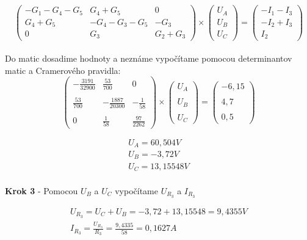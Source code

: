 \begin{equation*}
\begin{pmatrix}
-G_1 - G_4 - G_5 & G_4 + G_5 & 0 \\
G_4 + G_5 & -G_4 - G_3 - G_5 & -G_3 \\
0 & G_3 & G_2 + G_3 
\end{pmatrix}
\times
\begin{pmatrix}
U_A \\
U_B \\
U_C 
\end{pmatrix}
=
\begin{pmatrix}
-I_1 - I_3 \\
-I_2 + I_3 \\
I_2
\end{pmatrix}
\end{equation*}
\\

\noindent Do matic dosadime hodnoty a neznáme vypočítame pomocou determinantov matic a Cramerového pravidla: \\

\begin{equation*}
\begin{pmatrix}
- \frac {3191} {32900} & \frac {53} {700} & 0 \\\\
 \frac {53} {700} & - \frac {1887} {20300} & - \frac {1}{58} \\\\
0 &\frac {1}{58} & \frac {97} {2262} 
\end{pmatrix}
\times
\begin{pmatrix}
U_A \\\\
U_B \\\\
U_C 
\end{pmatrix}
=
\begin{pmatrix}
-6,15 \\\\
4,7 \\\\
0,5
\end{pmatrix}
\end{equation*}

\begin{gather*}
U_A = 60,504 V \\
 U_B = -3,72 V \\
U_C = 13,15548 V \\
\end{gather*}

\begin{center}
    \textbf{Krok 3} - Pomocou $U_{B}$ a $U_{C}$ vypočítame $U_{R_{3}}$ a $I_{R_{3}}$ 
\end{center}

\begin{gather*}
    U_{R_{3}} = U_C +  U_B = -3,72 + 13,15548 = 9,4355 V \\
    I_{R_{3}} = \frac {U_{R_{3}}} {R_3} = \frac {9,4335} {58} = 0,1627 A
\end{gather*}

